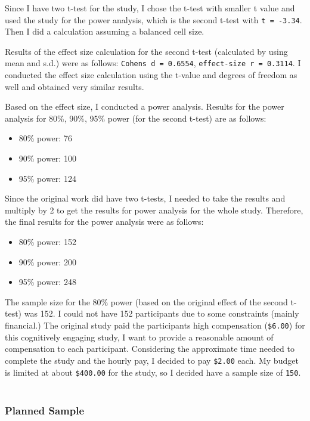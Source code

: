 \documentclass[]{article}
\providecommand{\tightlist}{%
  \setlength{\itemsep}{0pt}\setlength{\parskip}{0pt}}
\begin{document}
Since I have two t-test for the study, I chose the t-test with smaller t
value and used the study for the power analysis, which is the second
t-test with \texttt{t\ =\ -3.34}. Then I did a calculation assuming a
balanced cell size.

Results of the effect size calculation for the second t-test (calculated
by using mean and s.d.) were as follows:
\texttt{Cohen\textquotesingle{}s\ d\ =\ 0.6554},
\texttt{effect-size\ r\ =\ 0.3114}. I conducted the effect size
calculation using the t-value and degrees of freedom as well and
obtained very similar results.

Based on the effect size, I conducted a power analysis. Results for the
power analysis for 80\%, 90\%, 95\% power (for the second t-test) are as
follows:

\begin{itemize}
\tightlist
\item
  80\% power: 76
\item
  90\% power: 100
\item
  95\% power: 124
\end{itemize}

Since the original work did have two t-tests, I needed to take the
results and multiply by 2 to get the results for power analysis for the
whole study. Therefore, the final results for the power analysis were as
follows:

\begin{itemize}
\tightlist
\item
  80\% power: 152
\item
  90\% power: 200
\item
  95\% power: 248
\end{itemize}

The sample size for the 80\% power (based on the original effect of the
second t-test) was 152. I could not have 152 participants due to some
constraints (mainly financial.) The original study paid the participants
high compensation (\texttt{\$6.00}) for this cognitively engaging study,
I want to provide a reasonable amount of compensation to each
participant. Considering the approximate time needed to complete the
study and the hourly pay, I decided to pay \texttt{\$2.00} each. My
budget is limited at about \texttt{\$400.00} for the study, so I decided
have a sample size of \texttt{150}.\\
~\\

\hypertarget{planned-sample}{%
\subsubsection{Planned Sample}\label{planned-sample}}
\end{document}
